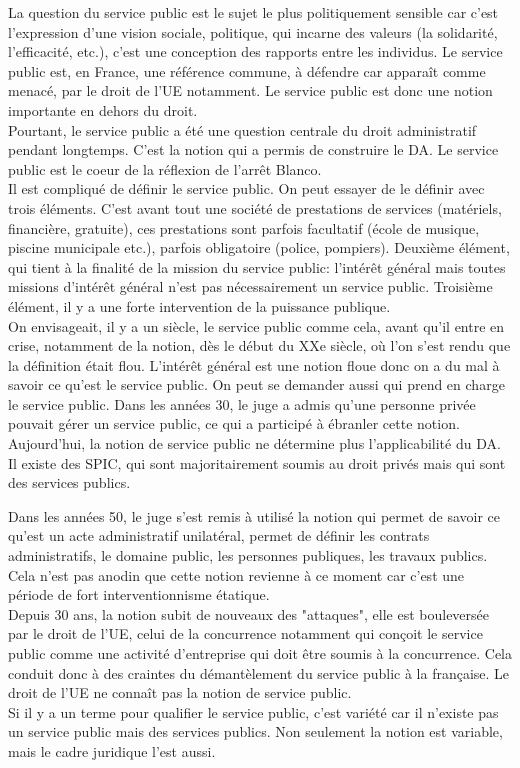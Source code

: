 \documentclass[10pt, a4paper, openany]{book}
\begin{document}
La question du service public est le sujet le plus politiquement sensible car c'est l'expression d'une vision sociale, politique, qui incarne des valeurs (la solidarité, l'efficacité, etc.), c'est une conception des rapports entre les individus. Le service public est, en France, une référence commune, à défendre car apparaît comme menacé, par le droit de l'UE notamment. Le service public est donc une notion importante en dehors du droit. \\
Pourtant, le service public a été une question centrale du droit administratif pendant longtemps. C'est la notion qui a permis de construire le DA. Le service public est le coeur de la réflexion de l'arrêt Blanco. \\
Il est compliqué de définir le service public. On peut essayer de le définir avec trois éléments. C'est avant tout une société de prestations de services (matériels, financière, gratuite), ces prestations sont parfois facultatif (école de musique, piscine municipale etc.), parfois obligatoire (police, pompiers). Deuxième élément, qui tient à la finalité de la mission du service public: l'intérêt général mais toutes missions d'intérêt général n'est pas nécessairement un service public. Troisième élément, il y a une forte intervention de la puissance publique. \\
On envisageait, il y a un siècle, le service public comme cela, avant qu'il entre en crise, notamment de la notion, dès le début du XXe siècle, où l'on s'est rendu que la définition était flou. L'intérêt général est une notion floue donc on a du mal à savoir ce qu'est le service public. On peut se demander aussi qui prend en charge le service public. Dans les années 30, le juge a admis qu'une personne privée pouvait gérer un service public, ce qui a participé à ébranler cette notion. \\
Aujourd'hui, la notion de service public ne détermine plus l'applicabilité du DA. Il existe des SPIC, qui sont majoritairement soumis au droit privés mais qui sont des services publics.


Dans les années 50, le juge s'est remis à utilisé la notion qui permet de savoir ce qu'est un acte administratif unilatéral, permet de définir les contrats administratifs, le domaine public, les personnes publiques, les travaux publics. \\
Cela n'est pas anodin que cette notion revienne à ce moment car c'est une période de fort interventionnisme étatique. \\
Depuis 30 ans, la notion subit de nouveaux des "attaques", elle est bouleversée par le droit de l'UE, celui de la concurrence notamment qui conçoit le service public comme une activité d'entreprise qui doit être soumis à la concurrence. Cela conduit donc à des craintes du démantèlement du service public à la française. Le droit de l'UE ne connaît pas la notion de service public. \\
Si il y a un terme pour qualifier le service public, c'est variété car il n'existe pas un service public mais des services publics. Non seulement la notion est variable, mais le cadre juridique l'est aussi.
\end{document}
